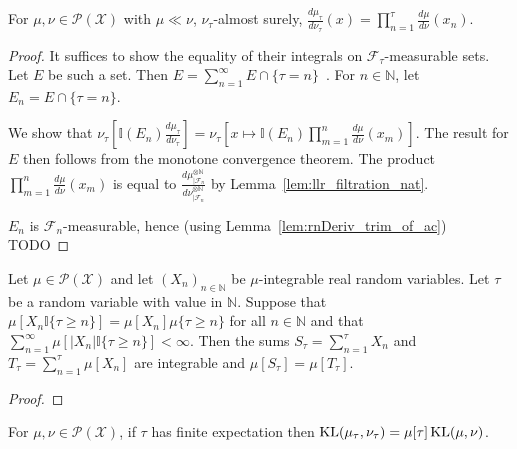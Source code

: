 \begin{lemma}
  \label{lem:llr_stopping_time}
  For $\mu, \nu \in \mathcal P(\mathcal X)$ with $\mu \ll \nu$, $\nu_\tau$-almost surely,
  $\frac{d \mu_\tau}{d \nu_\tau}(x) = \prod_{n=1}^\tau \frac{d \mu}{d \nu}(x_n)$.
\end{lemma}

\begin{proof}
It suffices to show the equality of their integrals on $\mathcal F_\tau$-measurable sets. Let $E$ be such a set.
Then $E = \sum_{n=1}^\infty E \cap \{\tau = n\}$~. For $n \in \mathbb{N}$, let $E_n = E \cap \{\tau = n\}$.

We show that $\nu_\tau \left[\mathbb{I}(E_n) \frac{d \mu_\tau}{d \nu_\tau}\right] = \nu_\tau\left[x \mapsto \mathbb{I}(E_n)\prod_{m=1}^n \frac{d \mu}{d \nu}(x_m)\right]$.
The result for $E$ then follows from the monotone convergence theorem.
The product $\prod_{m=1}^n \frac{d \mu}{d \nu}(x_m)$ is equal to $\frac{d \mu^{\otimes \mathbb{N}}_{| \mathcal F_n}}{d \nu^{\otimes \mathbb{N}}_{| \mathcal F_n}}$ by Lemma~\ref{lem:llr_filtration_nat}.

$E_n$ is $\mathcal F_n$-measurable, hence (using Lemma~\ref{lem:rnDeriv_trim_of_ac})
TODO

\end{proof}


\begin{lemma}
  \label{lem:wald_equation}
  \notready
  \uses{}
  Let $\mu \in \mathcal P(\mathcal X)$ and let $(X_n)_{n \in \mathbb{N}}$ be $\mu$-integrable real random variables. Let $\tau$ be a random variable with value in $\mathbb{N}$.
  Suppose that $\mu[X_n \mathbb{I}\{\tau \ge n\}] = \mu[X_n]\mu\{\tau \ge n\}$ for all $n \in \mathbb{N}$ and that $\sum_{n=1}^\infty \mu[|X_n| \mathbb{I}\{\tau \ge n\}] < \infty$. Then the sums $S_\tau = \sum_{n=1}^\tau X_n$ and $T_\tau = \sum_{n=1}^\tau \mu[X_n]$ are integrable and $\mu[S_\tau] = \mu[T_\tau]$. 
\end{lemma}

\begin{proof}%
\uses{}

\end{proof}


\begin{theorem}
  \label{thm:kl_stopping_time}
  For $\mu, \nu \in \mathcal P(\mathcal X)$, if $\tau$ has finite expectation then $\operatorname{KL}(\mu_\tau, \nu_\tau) = \mu[\tau] \operatorname{KL}(\mu, \nu)$.
\end{theorem}

